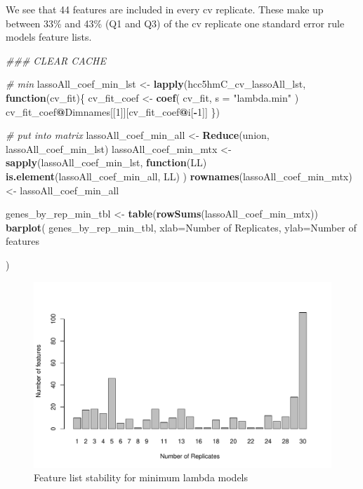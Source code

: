 \documentclass[
]{book}
\newenvironment{Shaded}{\begin{snugshade}}{\end{snugshade}}
\newcommand{\CommentTok}[1]{\textcolor[rgb]{0.56,0.35,0.01}{\textit{#1}}}
\newcommand{\ControlFlowTok}[1]{\textcolor[rgb]{0.13,0.29,0.53}{\textbf{#1}}}
\newcommand{\DataTypeTok}[1]{\textcolor[rgb]{0.13,0.29,0.53}{#1}}
\newcommand{\DecValTok}[1]{\textcolor[rgb]{0.00,0.00,0.81}{#1}}
\newcommand{\KeywordTok}[1]{\textcolor[rgb]{0.13,0.29,0.53}{\textbf{#1}}}
\newcommand{\NormalTok}[1]{#1}
\newcommand{\OperatorTok}[1]{\textcolor[rgb]{0.81,0.36,0.00}{\textbf{#1}}}
\newcommand{\StringTok}[1]{\textcolor[rgb]{0.31,0.60,0.02}{#1}}
\begin{document}
We see that 44 features are included in every
cv replicate. These make up between
33\%
and
43\%
(Q1 and Q3) of the cv replicate one standard error rule models feature lists.

\begin{Shaded}
\begin{Highlighting}[]
\CommentTok{\#\#\# CLEAR CACHE}


\CommentTok{\# min}
\NormalTok{lassoAll\_coef\_min\_lst <{-}}\StringTok{ }\KeywordTok{lapply}\NormalTok{(hcc5hmC\_cv\_lassoAll\_lst, }\ControlFlowTok{function}\NormalTok{(cv\_fit)\{}
\NormalTok{ cv\_fit\_coef <{-}}\StringTok{ }\KeywordTok{coef}\NormalTok{(}
\NormalTok{ cv\_fit,}
 \DataTypeTok{s =} \StringTok{"lambda.min"}
\NormalTok{ )}
\NormalTok{ cv\_fit\_coef}\OperatorTok{@}\NormalTok{Dimnames[[}\DecValTok{1}\NormalTok{]][cv\_fit\_coef}\OperatorTok{@}\NormalTok{i[}\OperatorTok{{-}}\DecValTok{1}\NormalTok{]]}
\NormalTok{ \})}

\CommentTok{\# put into matrix}
\NormalTok{lassoAll\_coef\_min\_all <{-}}\StringTok{ }\KeywordTok{Reduce}\NormalTok{(union, lassoAll\_coef\_min\_lst)}
\NormalTok{lassoAll\_coef\_min\_mtx <{-}}\StringTok{ }\KeywordTok{sapply}\NormalTok{(lassoAll\_coef\_min\_lst, }
  \ControlFlowTok{function}\NormalTok{(LL) }\KeywordTok{is.element}\NormalTok{(lassoAll\_coef\_min\_all, LL)}
\NormalTok{)}
\KeywordTok{rownames}\NormalTok{(lassoAll\_coef\_min\_mtx) <{-}}\StringTok{ }\NormalTok{lassoAll\_coef\_min\_all}

\NormalTok{genes\_by\_rep\_min\_tbl <{-}}\StringTok{ }\KeywordTok{table}\NormalTok{(}\KeywordTok{rowSums}\NormalTok{(lassoAll\_coef\_min\_mtx))}
\KeywordTok{barplot}\NormalTok{(}
\NormalTok{ genes\_by\_rep\_min\_tbl,}
 \DataTypeTok{xlab=}\StringTok{\textquotesingle{}Number of Replicates\textquotesingle{}}\NormalTok{,}
 \DataTypeTok{ylab=}\StringTok{\textquotesingle{}Number of features\textquotesingle{}}

\NormalTok{)}
\end{Highlighting}
\end{Shaded}

\begin{figure}
\centering
\includegraphics{Static/figures/hcc5hmC-glmnetSuite-feature-list-min-1.pdf}
\caption{\label{fig:hcc5hmC-glmnetSuite-feature-list-min}Feature list stability for minimum lambda models}
\end{figure}
\end{document}
